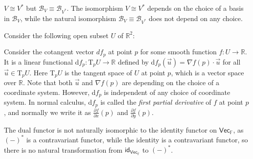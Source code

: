 \documentclass[
	11pt, %
	fleqn, %
	a4paper, %
]{LegrandOrangeBook}
\newcommand{\F}{\mathbb{F}} %
\newcommand{\id}{\mathsf{id}} %
\newcommand{\Vect}{\boldsymbol{\mathsf{Vec}}} %
\newcommand{\B}{\mathcal{B}} %
\newcommand{\R}{\mathbb{R}} %
\begin{document}
\begin{remark}
    $V \cong V^*$ but $\B_V \equiv \B_{V^*}$. The isomorphism $V \cong V^*$ depends on the choice of a basis in $\B_V$, while the natural isomorphism $\B_V \equiv \B_{V^*}$ does not depend on any choice.
\end{remark}

\begin{example}
    Consider the following open subset $U$ of $\R^2$:
    \begin{center}
	\end{center}
    Consider the cotangent vector $df_p$ at point $p$ for some smooth function $f : U \to \R$. It is a linear functional d$f_p : \text{T}_p U \to \R$ defined by d$f_p(\vec{u}) = \nabla f(p) \cdot \vec{u}$ for all $\vec{u} \in \text{T}_p U$. Here T$_p U$ is the tangent space of $U$ at point $p$, which is a vector space over $\R$. Note that both $\vec{u}$ and $\nabla f(p)$ are depending on the choice of a coordinate system. However, d$f_p$ is independent of any choice of coordinate system. In normal calculus, d$f_p$ is called the \emph{first partial derivative} of $f$ at point $p$, and normally we write it as $\frac{\partial f}{\partial x}(p)$ and $\frac{\partial f}{\partial y}(p)$.
\end{example}

The dual functor is not naturally isomorphic to the identity functor on $\Vect_{\F}$, as $(-)^*$ is a contravariant functor, while the identity is a contravariant functor, so there is no natural transformation from $\id_{\Vect_{\F}}$ to $(-)^*$. 
\end{document}
